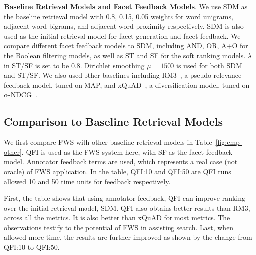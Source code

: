 \textbf{Baseline Retrieval Models and Facet Feedback Models}. We use SDM as the baseline retrieval model with 0.8, 0.15, 0.05 weights for word unigrams, adjacent word bigrams, and adjacent word proximity respectively. SDM is also used as the initial retrieval model for facet generation and facet feedback. We compare different facet feedback models to SDM, including AND, OR, A+O for the Boolean filtering models, as well as ST and SF for the soft ranking models. $\lambda$ in ST/SF is set to be 0.8. Dirichlet smoothing $\mu=1500$ is used for both SDM and ST/SF. We also used other baselines including RM3~\cite{abdul2004umass,lavrenko2001relevance}, a pseudo relevance feedback model, tuned on MAP, and xQuAD~\cite{santos2010exploiting}, a diversification model, tuned on $\alpha$-NDCG~\cite{clarke2008novelty}.

\subsection{Comparison to Baseline Retrieval Models}
We first compare FWS with other baseline retrieval models in Table~\ref{fig:cmp-other}. QFI is used as the FWS system here, with SF as the facet feedback model. Annotator feedback terms are used, which represents a real case (not oracle) of FWS application. 
In the table, QFI:10 and QFI:50 are QFI runs allowed 10 and 50 time units for feedback respectively. 

First, the table shows that using annotator feedback, QFI can improve ranking over the initial retrieval model, SDM. QFI also obtains better results than RM3, across all the metrics. It is also better than xQuAD for most metrics. The observations testify to the potential of FWS in assisting search. Last, when allowed more time, the results are further improved as shown by the change from QFI:10 to QFI:50.

